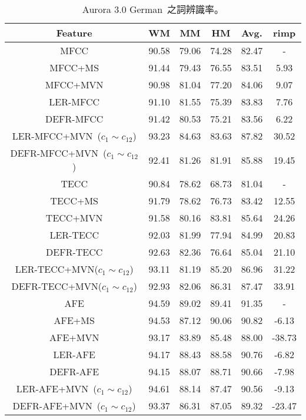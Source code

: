 \begin{table}[!htb]
\renewcommand{\arraystretch}{1.1}
\centering
\caption{Aurora 3.0 German~之詞辨識率。}
\label{table:aurora3_german}  
\vspace{2mm}
\begin{tabular}{c|ccc|c|c}
\hline 
Feature & WM & MM & HM & Avg. & rimp  \\ 
\hline \hline
{MFCC} & 90.58  & 79.06  & 74.28 & 82.47 & -\\
{MFCC+MS} & 91.44  & 79.43  & 76.55 & 83.51 & 5.93\\ 
{MFCC+MVN} & 90.98  & 81.04  & 77.20  & 84.06 & 9.07\\
{LER-MFCC} & 91.10  & 81.55  & 75.39  & 83.83 & 7.76\\
{DEFR-MFCC} & 91.42  & 80.53  & 75.21  & 83.56 & 6.22\\
{LER-MFCC+MVN~($c_1 \sim c_{12}$)} & 93.23  & 84.63  & 83.63  & 87.82 & 30.52\\
{DEFR-MFCC+MVN~($c_1 \sim c_{12}$)} & 92.41  & 81.26  & 81.91  & 85.88 & 19.45\\
\hline
{TECC} & 90.84  & 78.62  & 68.73  & 81.04 & -\\
{TECC+MS} & 91.79  & 78.62  & 76.73  & 83.42 & 12.55\\
{TECC+MVN} & 91.58  & 80.16  & 83.81  & 85.64 & 24.26\\
{LER-TECC} & 92.03  & 81.99  & 77.94  & 84.99 & 20.83\\
{DEFR-TECC} & 92.63  & 82.36  & 76.64  & 85.04 & 21.10\\
{LER-TECC+MVN($c_1 \sim c_{12}$)} & 93.11  & 81.19  & 85.20  & 86.96 & 31.22\\
{DEFR-TECC+MVN($c_1 \sim c_{12}$)} & 92.93  & 82.06  & 86.31  & 87.47 & 33.91\\
\hline
{AFE} & 94.59  & 89.02  & 89.41  & 91.35 & -\\
{AFE+MS} & 94.53  & 87.12  & 90.06  & 90.82 & -6.13\\
{AFE+MVN} & 93.17  & 83.89  & 85.48  & 88.00 & -38.73\\
{LER-AFE} & 94.17  & 88.43  & 88.58  & 90.76 & -6.82\\
{DEFR-AFE} & 94.15  & 88.07  & 88.71  & 90.66 & -7.98\\
{LER-AFE+MVN~($c_1 \sim c_{12}$)} & 94.61  & 88.14  & 87.47  & 90.56 & -9.13\\
{DEFR-AFE+MVN~($c_1 \sim c_{12}$)} & 93.37  & 86.31  & 87.05  & 89.32 & -23.47\\
\hline
\end{tabular}
\end{table}

